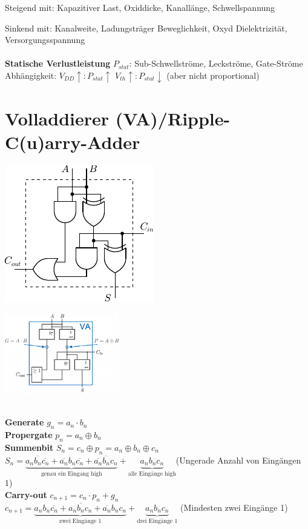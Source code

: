 \documentclass[6pt,a4paper]{scrartcl}
\renewcommand{\emph}[1]{\textsf{\textbf{#1}}}
\newcommand{\ol}[1]{\ensuremath{\overline{#1}}}									%
\begin{document}
\begin{multicols*}{3}
	Steigend mit: Kapazitiver Last, Oxiddicke, Kanallänge, Schwellspannung
	
	Sinkend mit: Kanalweite, Ladungsträger Beweglichkeit, Oxyd Dielektrizität, Versorgungsspannung \\ \\
	\emph{Statische Verlustleistung} $P_{stat}$: Sub-Schwellströme, Leckströme, Gate-Ströme
	Abhängigkeit: $V_{DD}\uparrow:P_{stat}\uparrow$ \qquad $V_{th}\uparrow:P_{stat}\downarrow$ \quad (aber nicht proportional)

\section{Volladdierer (VA)/Ripple-C(u)arry-Adder}
\parbox{5.0cm}{ \includegraphics{./img/ds/volladdierer.pdf} }
\hspace*{-.7cm}\parbox{5.0cm}{ \includegraphics[width=5.0cm]{./img/ds/volladdierer-iec.png} } \\
\textbf{Generate} $g_n = a_n \cdot b_n$\\
\textbf{Propergate} $p_n = a_n \oplus b_n$\\
\textbf{Summenbit} $S_n = c_n \oplus p_n= a_n \oplus b_n \oplus c_n$\\
$S_n = \underbrace{a_n\ol{b_n} \ol{c_n} + \ol{a_n}b_n\ol{c_n} + \ol{a_n}\ol{b_n}c_n}_{\text{genau ein Eingang high}} + \underbrace{a_nb_nc_n}_{\text{alle Eingänge high}}$(Ungerade Anzahl von Eingängen 1) \\
\textbf{Carry-out} $c_{n+1} = c_n \cdot p_n + g_n$\\
$c_{n+1}=\underbrace{a_nb_n\ol{c_n} + a_n\ol{b_n}c_n + \ol{a_n}b_nc_n}_{\text{zwei Eingänge 1}} + \underbrace{a_nb_nc_n}_{\text{drei Eingänge 1}}$ (Mindesten zwei Eingänge 1)

\end{multicols*}
\end{document}
